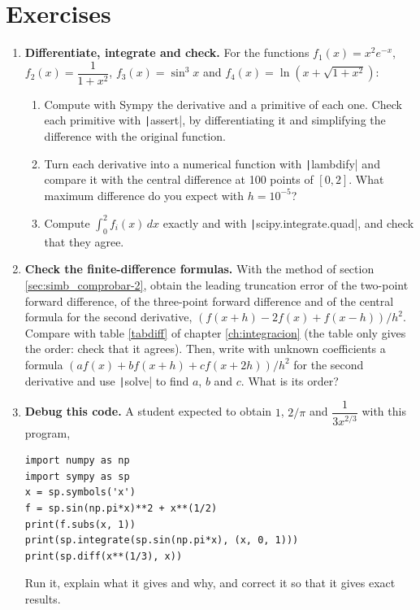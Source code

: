 \section{Exercises}
\begin{enumerate}
\item \label{ej:sim_deriv_int-en} \textbf{Differentiate, integrate and check.} For the functions $f_1(x)=x^2e^{-x}$, $f_2(x)=\dfrac{1}{1+x^2}$, $f_3(x)=\sin^3 x$ and $f_4(x)=\ln(x+\sqrt{1+x^2})$:
\begin{enumerate}
\item Compute with Sympy the derivative and a primitive of each one. Check each primitive with \texttt|assert|, by differentiating it and simplifying the difference with the original function.
\item Turn each derivative into a numerical function with \texttt|lambdify| and compare it with the central difference at 100 points of $[0,2]$. What maximum difference do you expect with $h=10^{-5}$?
\item Compute $\int_0^2 f_i(x)\,dx$ exactly and with \texttt|scipy.integrate.quad|, and check that they agree.
\end{enumerate}

\item \label{ej:sim_taylor_dif-en} \textbf{Check the finite-difference formulas.} With the method of section \ref{sec:simb_comprobar-2}, obtain the leading truncation error of the two-point forward difference, of the three-point forward difference and of the central formula for the second derivative, $\left(f(x+h)-2f(x)+f(x-h)\right)/h^2$. Compare with table \ref{tabdiff} of chapter \ref{ch:integracion} (the table only gives the order: check that it agrees). Then, write with unknown coefficients a formula $\left(a f(x)+b f(x+h)+c f(x+2h)\right)/h^2$ for the second derivative and use \texttt|solve| to find $a$, $b$ and $c$. What is its order?

\item \label{ej:sim_depura-en} \textbf{Debug this code.} A student expected to obtain $1$, $2/\pi$ and $\dfrac{1}{3x^{2/3}}$ with this program,
\begin{verbatim}
import numpy as np
import sympy as sp
x = sp.symbols('x')
f = sp.sin(np.pi*x)**2 + x**(1/2)
print(f.subs(x, 1))
print(sp.integrate(sp.sin(np.pi*x), (x, 0, 1)))
print(sp.diff(x**(1/3), x))
\end{verbatim}
Run it, explain what it gives and why, and correct it so that it gives exact results.


\end{enumerate}
